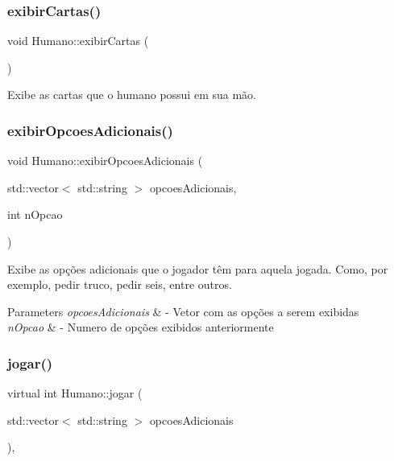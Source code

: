 \subsubsection{\texorpdfstring{exibirCartas()}{exibirCartas()}}
{\footnotesize\ttfamily void Humano\+::exibir\+Cartas (\begin{DoxyParamCaption}{ }\end{DoxyParamCaption})}



Exibe as cartas que o humano possui em sua mão. 

\mbox{\label{class_humano_a9be2c952d918117be73a00f2c538834c}} 
\subsubsection{\texorpdfstring{exibirOpcoesAdicionais()}{exibirOpcoesAdicionais()}}
{\footnotesize\ttfamily void Humano\+::exibir\+Opcoes\+Adicionais (\begin{DoxyParamCaption}\item[{std\+::vector$<$ std\+::string $>$}]{opcoes\+Adicionais,  }\item[{int}]{n\+Opcao }\end{DoxyParamCaption})}



Exibe as opções adicionais que o jogador têm para aquela jogada. Como, por exemplo, pedir truco, pedir seis, entre outros. 


\begin{DoxyParams}{Parameters}
{\em opcoes\+Adicionais} & -\/ Vetor com as opções a serem exibidas \\
\hline
{\em n\+Opcao} & -\/ Numero de opções exibidos anteriormente \\
\hline
\end{DoxyParams}
\mbox{\label{class_humano_aad706f019b99747f9c49d915f678998d}} 
\subsubsection{\texorpdfstring{jogar()}{jogar()}}
{\footnotesize\ttfamily virtual int Humano\+::jogar (\begin{DoxyParamCaption}\item[{std\+::vector$<$ std\+::string $>$}]{opcoes\+Adicionais }\end{DoxyParamCaption})\hspace{0.3cm}{\ttfamily [override]}, {\ttfamily [virtual]}}



